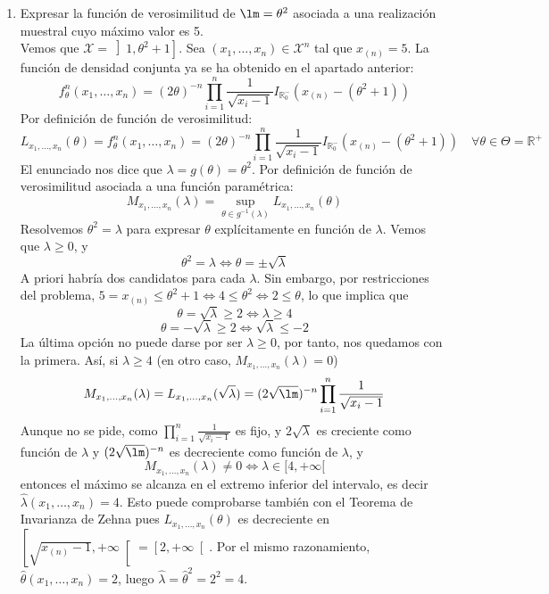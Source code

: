 \documentclass[12pt]{article}
\newcommand{\R}{\mathbb{R}}
\newcommand{\Rmas}{\R^{+}}
\newcommand{\X}{\mathcal{X}}
\begin{document}
\begin{ejercicio}
\begin{enumerate}[label=\alph*)]
            \item Expresar la función de verosimilitud de $\lm = \theta^2$ asociada a una realización muestral cuyo máximo valor es 5. \\
            
            Vemos que $\X = \left]1, \theta^2+1 \right]$. Sea $(x_1, \ldots, x_n) \in \X^n$ tal que 
            $x_{(n)} = 5$. La función de densidad conjunta ya se ha obtenido en el apartado anterior:
            $$f^n_\theta(x_1, \ldots, x_n) = (2\theta)^{-n} \prod_{i=1}^{n} \frac{1}{\sqrt{x_i-1}} I_{\R_0^{-}}(x_{(n)} - (\theta^2+1))$$
            Por definición de función de verosimilitud:
            $$L_{x_1, \ldots, x_n}(\theta) = f_\theta^n(x_1, \ldots, x_n) = 
            (2\theta)^{-n} \prod_{i=1}^{n} \frac{1}{\sqrt{x_i-1}} I_{\R_0^{-}}(x_{(n)} - (\theta^2+1))
            \quad \forall \theta \in \Theta = \Rmas$$
            El enunciado nos dice que $\lambda = g(\theta) = \theta^2$. Por definición 
            de función de verosimilitud asociada a una función paramétrica:
            $$M_{x_1, \ldots, x_n}(\lambda) = \sup_{\theta \in g^{-1}(\lambda)} L_{x_1, \ldots, x_n}(\theta)$$ 
            Resolvemos $\theta^2 = \lambda$ para expresar $\theta$ explícitamente en función de $\lambda$. 
            Vemos que $\lambda \geqslant 0$, y 
            $$\theta^2 = \lambda \iff \theta = \pm \sqrt{\lambda}$$ 
            A priori habría dos candidatos para cada $\lambda$. Sin embargo, por restricciones del problema, 
            $5 = x_{(n)} \leqslant \theta^2 + 1 \iff 4 \leq \theta^2 \iff 2 \leq \theta$, lo que implica que
            $$\theta = \sqrt{\lambda} \geqslant 2 \iff \lambda \geqslant 4$$
            $$\theta = - \sqrt{\lambda} \geqslant 2 \iff \sqrt{\lambda} \leqslant -2$$
            La última opción no puede darse por ser $\lambda \geqslant 0$, por tanto, nos quedamos con la primera. 
            Así, si $\lambda \geqslant 4$ (en otro caso, $M_{x_1, \ldots, x_n}(\lambda) = 0$)
            $$M_{x_1, \ldots, x_n}(\lambda) = L_{x_1, \ldots, x_n} (\sqrt{\lambda}) = 
            (2 \sqrt{\lm})^{-n} \prod_{i=1}^{n} \frac{1}{\sqrt{x_i-1}}$$
            Aunque no se pide, como $\prod_{i=1}^{n} \frac{1}{\sqrt{x_i-1}}$ es fijo, y $2 \sqrt{\lambda}$ es creciente como 
            función de $\lambda$ y $(2 \sqrt{\lm})^{-n}$ es decreciente como función de $\lambda$, y 
            $$M_{x_1, \ldots, x_n}(\lambda) \neq 0 \iff \lambda \in [4, +\infty[$$ entonces
            el máximo se alcanza en el extremo inferior del intervalo, es decir 
            $\hat{\lambda}(x_1, \ldots, x_n) = 4$. Esto puede comprobarse también con el 
            Teorema de Invarianza de Zehna pues $L_{x_1, \ldots, x_n}(\theta)$ es decreciente en 
            $\left[\sqrt{x_{(n)}-1}, +\infty \right[ = \left[2, + \infty \right[ $. 
            Por el mismo razonamiento, $\hat{\theta}(x_1, \ldots, x_n) = 2$, luego 
            $\hat{\lambda} = \hat{\theta}^2 = 2^2 = 4$.

        \end{enumerate}
    \end{ejercicio}
\end{document}
